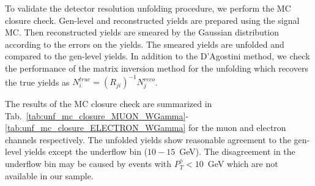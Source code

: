 To validate the detector resolution unfolding procedure, we perform the MC closure check. Gen-level and reconstructed yields are prepared using the signal MC. Then reconstructed yields are smeared by the Gaussian distribution according to the errors on the yields. The smeared yields are unfolded and compared to the gen-level yields. In addition to the D'Agostini method, we check the performance of the matrix inversion method for the unfolding which recovers the true yields as $N^{true}_i = (R_{ji})^{-1} N^{reco}_j$. 

The results of the MC closure check are summarized in Tab.~\ref{tab:unf_mc_closure_MUON_WGamma}-\ref{tab:unf_mc_closure_ELECTRON_WGamma} for the muon and electron channels respectively. The unfolded yields show reasonable agreement to the gen-level yields except the underflow bin ($10-15$~GeV). The disagreement in the underflow bin may be caused by events with $P_T^{\gamma}<10$~GeV which are not available in our sample. 


